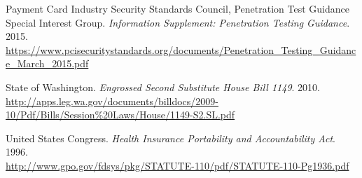 \documentclass[a4paper,12pt]{article}
\begin{document}
\begin{thebibliography}{}
		Payment Card Industry Security Standards Council, Penetration Test Guidance Special Interest Group. \textit{Information Supplement: Penetration Testing Guidance}. 2015.\\
		\url{https://www.pcisecuritystandards.org/documents/Penetration_Testing_Guidance_March_2015.pdf}
		
		State of Washington. \textit{Engrossed Second Substitute House Bill 1149}. 2010.\\
		\url{http://apps.leg.wa.gov/documents/billdocs/2009-10/Pdf/Bills/Session\%20Laws/House/1149-S2.SL.pdf}
		
		United States Congress. \textit{Health Insurance Portability and Accountability Act}. 1996.\\
		\url{http://www.gpo.gov/fdsys/pkg/STATUTE-110/pdf/STATUTE-110-Pg1936.pdf}
		
	\end{thebibliography}
	\endgroup
\end{document}
